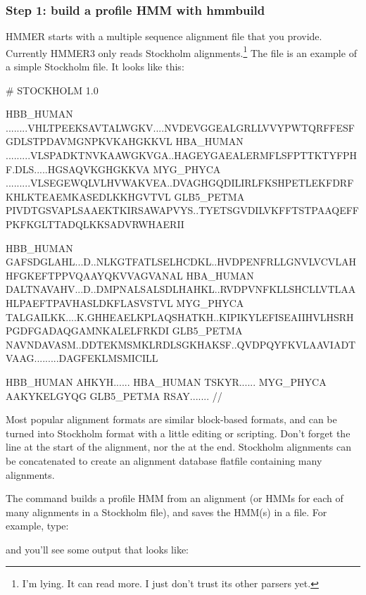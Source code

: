 \subsubsection{Step 1: build a profile HMM with hmmbuild}

HMMER starts with a multiple sequence alignment file that you
provide. Currently HMMER3 only reads Stockholm
alignments.\footnote{I'm lying. It can read more. I just don't trust
its other parsers yet.} The file  is an
example of a simple Stockholm file. It looks like this:

\begin{sreoutput}
# STOCKHOLM 1.0

HBB_HUMAN   ........VHLTPEEKSAVTALWGKV....NVDEVGGEALGRLLVVYPWTQRFFESFGDLSTPDAVMGNPKVKAHGKKVL
HBA_HUMAN   .........VLSPADKTNVKAAWGKVGA..HAGEYGAEALERMFLSFPTTKTYFPHF.DLS.....HGSAQVKGHGKKVA
MYG_PHYCA   .........VLSEGEWQLVLHVWAKVEA..DVAGHGQDILIRLFKSHPETLEKFDRFKHLKTEAEMKASEDLKKHGVTVL
GLB5_PETMA  PIVDTGSVAPLSAAEKTKIRSAWAPVYS..TYETSGVDILVKFFTSTPAAQEFFPKFKGLTTADQLKKSADVRWHAERII

HBB_HUMAN   GAFSDGLAHL...D..NLKGTFATLSELHCDKL..HVDPENFRLLGNVLVCVLAHHFGKEFTPPVQAAYQKVVAGVANAL
HBA_HUMAN   DALTNAVAHV...D..DMPNALSALSDLHAHKL..RVDPVNFKLLSHCLLVTLAAHLPAEFTPAVHASLDKFLASVSTVL
MYG_PHYCA   TALGAILKK....K.GHHEAELKPLAQSHATKH..KIPIKYLEFISEAIIHVLHSRHPGDFGADAQGAMNKALELFRKDI
GLB5_PETMA  NAVNDAVASM..DDTEKMSMKLRDLSGKHAKSF..QVDPQYFKVLAAVIADTVAAG.........DAGFEKLMSMICILL

HBB_HUMAN   AHKYH......
HBA_HUMAN   TSKYR......
MYG_PHYCA   AAKYKELGYQG
GLB5_PETMA  RSAY.......
//
\end{sreoutput}


Most popular alignment formats are similar block-based formats, and
can be turned into Stockholm format with a little editing or
scripting. Don't forget the  line at the start
of the alignment, nor the \prog{//} at the end. Stockholm alignments
can be concatenated to create an alignment database flatfile
containing many alignments.


The  command builds a profile HMM from an alignment (or
HMMs for each of many alignments in a Stockholm file), and saves the
HMM(s) in a file. For example, type:


and you'll see some output that looks like:

